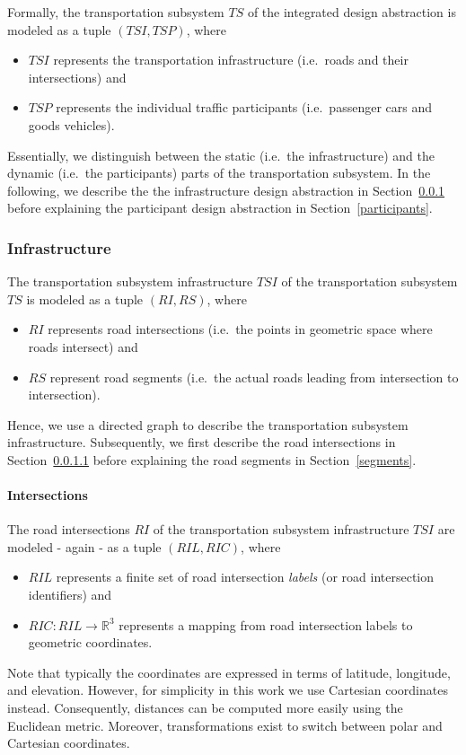 Formally, the transportation subsystem $TS$ of the integrated design abstraction is modeled as a tuple $(TSI, TSP)$, where
\begin{itemize}
	\item $TSI$ represents the transportation infrastructure (i.e.\ roads and their intersections) and
	\item $TSP$ represents the individual traffic participants (i.e.\ passenger cars and goods vehicles).
\end{itemize}
Essentially, we distinguish between the static (i.e.\ the infrastructure) and the dynamic (i.e.\ the participants) parts of the transportation subsystem. In the following, we describe the the infrastructure design abstraction in Section~\ref{transport_infrastructure} before explaining the participant design abstraction in Section~\ref{participants}.

\subsubsection{Infrastructure}
\label{transport_infrastructure}

The transportation subsystem infrastructure $TSI$ of the transportation subsystem $TS$ is modeled as a tuple $(RI, RS)$, where
\begin{itemize}
	\item $RI$ represents road intersections (i.e.\ the points in geometric space where roads intersect) and
	\item $RS$ represent road segments (i.e.\ the actual roads leading from intersection to intersection).
\end{itemize}
Hence, we use a directed graph to describe the transportation subsystem infrastructure. Subsequently, we first describe the road intersections in Section~\ref{intersections} before explaining the road segments in Section~\ref{segments}.

\paragraph{Intersections}
\label{intersections}

The road intersections $RI$ of the transportation subsystem infrastructure $TSI$ are modeled - again - as a tuple $(RIL, RIC)$, where
\begin{itemize}
	\item $RIL$ represents a finite set of road intersection \textit{labels} (or road intersection identifiers) and
	\item $RIC: RIL \rightarrow \mathbb{R}^3$ represents a mapping from road intersection labels to geometric coordinates.
\end{itemize}
Note that typically the coordinates are expressed in terms of latitude, longitude, and elevation. However, for simplicity in this work we use Cartesian coordinates instead. Consequently, distances can be computed more easily using the Euclidean metric. Moreover, transformations exist to switch between polar and Cartesian coordinates.

